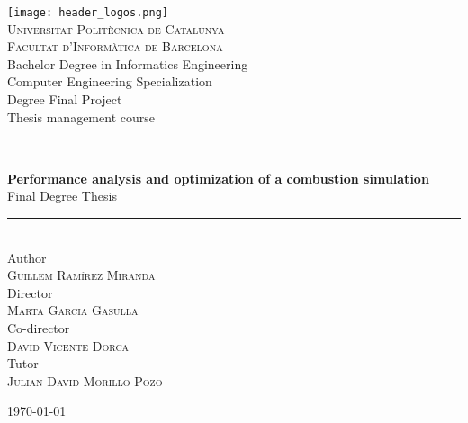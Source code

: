 \begin{titlepage}

  \newcommand{\HRule}{\rule{\linewidth}{0.5mm}}

  \begin{center}
    
    \texttt{[image: header\_logos.png]}\\[0.7cm]

    \textsc{\Large Universitat Politècnica de Catalunya}\\[0.1cm]
    \textsc{\large Facultat d'Informàtica de Barcelona}\\[0.4cm]
    {\large Bachelor Degree in Informatics Engineering}\\[0.1cm]
    {\large Computer Engineering Specialization}\\[0.1cm]
    {\large Degree Final Project}\\[0.1cm]
    {\large Thesis management course}\\[1cm]

    \HRule\\[0.4cm]

    {
      \LARGE\bfseries Performance analysis and optimization of a combustion simulation\\[0.2cm]
    }
    {\large Final Degree Thesis}
    \\[0.4cm]\HRule\\[1cm]

    {\large Author}\\[0.1cm]
    \textsc{\large Guillem Ramírez Miranda}\\[0.4cm]
    {\large Director}\\[0.1cm]
    \textsc{\large Marta Garcia Gasulla}\\[0.4cm]
    {\large Co-director}\\[0.1cm]
    \textsc{\large David Vicente Dorca}\\[0.4cm]
    {\large Tutor}\\[0.1cm]
    \textsc{\large Julian David Morillo Pozo}\\[0.4cm]
    \vfill
    {\large \today\par}

  \end{center}

\end{titlepage}

